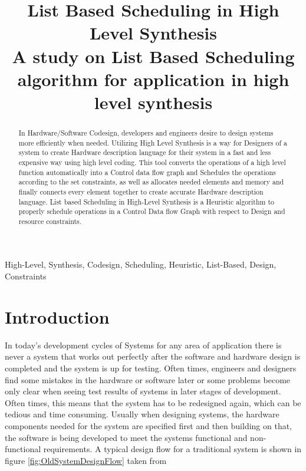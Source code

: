 \documentclass[conference]{IEEEtran}
\begin{document}
\title{List Based Scheduling in High Level Synthesis\\
{\footnotesize A study on List Based Scheduling algorithm for application in high level synthesis}
}

\author{
}

\maketitle

\begin{abstract}
In Hardware/Software Codesign, developers and engineers desire to design systems more efficiently when needed. Utilizing High Level Synthesis is a way for Designers of a system to create Hardware description language for their system in a fast and less expensive way using high level coding. This tool converts the operations of a  high level function automatically into a Control data flow graph and Schedules the operations according to the set constraints, as well as allocates needed elements and memory and finally connects every element together to create accurate Hardware description language. List based Scheduling in High-Level Synthesis is a Heuristic algorithm to properly schedule operations in a Control Data flow Graph with respect to Design and resource constraints.
\end{abstract}

\begin{IEEEkeywords}
High-Level, Synthesis, Codesign, Scheduling, Heuristic, List-Based, Design, Constraints
\end{IEEEkeywords}

\section{Introduction}
In today's development cycles of Systems for any area of application there is never a system that works out perfectly after the software and hardware design is completed and the system is up for testing. Often times, engineers and designers find some mistakes in the hardware or software later or some problems become only clear when seeing test results of systems in later stages of development. Often times, this means that the system has to be redesigned again, which can be tedious and time consuming. Usually when designing systems, the hardware components needed for the system are specified first and then building on that, the software is being developed to meet the systems functional and non-functional requirements\cite{HandbookHWSWCodesign}. A typical design flow for a traditional system is shown in figure \ref{fig:OldSystemDesignFlow} taken from \cite{HandbookHWSWCodesign}
\end{document}
